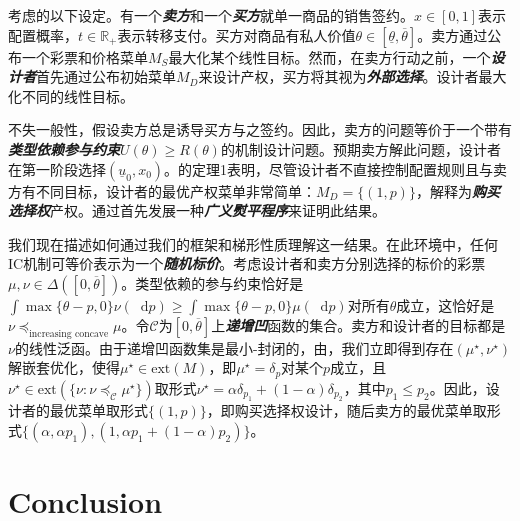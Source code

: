 \documentclass[12pt,letterpaper]{article}
\newenvironment{translation}{\color{blue}}{}
\theoremstyle{plain}
\theoremstyle{definition}
\theoremstyle{remark}
\newcommand{\C}{\mathcal{C}}
\newcommand{\R}{\mathds{R}}
\newcommand{\Ext}{\mathrm{ext}}
\renewcommand*\d{\mathop{}\!\mathrm{d}}
\theoremstyle{definition}
\begin{document}
\begin{translation}
考虑\citet{DworczakMuir2024}的以下设定。有一个\textit{\textbf{卖方}}和一个\textit{\textbf{买方}}就单一商品的销售签约。$x \in [0, 1]$表示配置概率，$t \in \R_+$表示转移支付。买方对商品有私人价值$\theta \in [\underline{\theta}, \overline{\theta}]$。卖方通过公布一个彩票和价格菜单$M_S$最大化某个线性目标。然而，在卖方行动之前，一个\textit{\textbf{设计者}}首先通过公布初始菜单$M_D$来设计产权，买方将其视为\textit{\textbf{外部选择}}。设计者最大化不同的线性目标。

不失一般性，假设卖方总是诱导买方与之签约。因此，卖方的问题等价于一个带有\textit{\textbf{类型依赖参与约束}}$U(\theta) \geq R(\theta)$的机制设计问题。预期卖方解此问题，设计者在第一阶段选择$(\underline{u}_0, x_0)$。\citet{DworczakMuir2024}的定理1表明，尽管设计者不直接控制配置规则且与卖方有不同目标，设计者的最优产权菜单非常简单：$M_D = \{(1, p)\}$，解释为\textit{\textbf{购买选择权}}产权。\citet{DworczakMuir2024}通过首先发展一种\textit{\textbf{广义熨平程序}}来证明此结果。

我们现在描述如何通过我们的框架和梯形性质理解这一结果。在此环境中，任何IC机制可等价表示为一个\textit{\textbf{随机标价}}。考虑设计者和卖方分别选择的标价的彩票$\mu, \nu \in \Delta([0,\overline{\theta}])$。类型依赖的参与约束恰好是$\int \max\{\theta - p, 0\} \nu(\d p) \geq \int \max\{\theta - p, 0\} \mu(\d p)$对所有$\theta$成立，这恰好是$\nu \preceq_{\text{increasing concave}} \mu$。令$\C$为$[0, \overline{\theta}]$上\textit{\textbf{递增凹}}函数的集合。卖方和设计者的目标都是$\nu$的线性泛函。由于递增凹函数集是最小-封闭的，由，我们立即得到存在$(\mu^\star, \nu^\star)$解嵌套优化，使得$\mu^\star \in \Ext(M)$，即$\mu^\star = \delta_p$对某个$p$成立，且$\nu^\star \in \Ext(\{\nu: \nu \preceq_\C \mu^\star\})$取形式$\nu^\star = \alpha \delta_{p_1} + (1 - \alpha) \delta_{p_2}$，其中$p_1 \leq p_2$。因此，设计者的最优菜单取形式$\{(1, p)\}$，即购买选择权设计，随后卖方的最优菜单取形式$\{(\alpha, \alpha p_1), (1, \alpha p_1 + (1 - \alpha) p_2)\}$。
\end{translation}

\section{Conclusion}\label{sec:conclusion}
\end{document}
